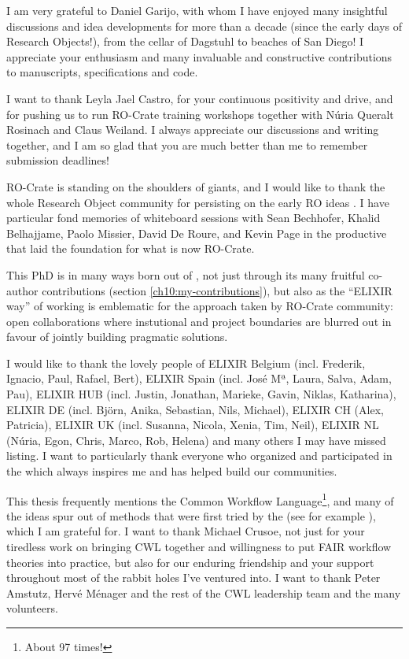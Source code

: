 I am very grateful to Daniel Garijo, with whom I have enjoyed many insightful discussions and idea developments for more than a decade (since the early days of Research Objects!), from the cellar of Dagstuhl to beaches of San Diego! I appreciate your enthusiasm and many invaluable and constructive contributions to manuscripts, specifications and code.

I want to thank Leyla Jael Castro, for your continuous positivity and drive, and for pushing us to run RO-Crate training workshops together with Núria Queralt Rosinach and Claus Weiland. I always appreciate our discussions and writing together, and I am so glad that you are much better than me to remember submission deadlines!

RO-Crate is standing on the shoulders of giants, and I would like to thank the whole Research Object community \cite{goble-ro2018} for persisting on the early RO ideas \cite{ch5-93, Bechhofer 2013}. I have particular fond memories of whiteboard sessions with Sean Bechhofer, Khalid Belhajjame, Paolo Missier, David De Roure, and Kevin Page in the productive  that laid the foundation for what is now RO-Crate.

This PhD is in many ways born out of 
, not just 
through its many fruitful co-author contributions 
(section \vref{ch10:my-contributions}), 
but also as the ``ELIXIR way'' of working is emblematic for the approach taken by RO-Crate community: open collaborations where instutional and project boundaries are blurred out in favour of jointly building pragmatic solutions.

I would like to thank the lovely people of ELIXIR Belgium (incl. Frederik, Ignacio, Paul, Rafael, Bert), ELIXIR Spain (incl. José Mª, Laura, Salva, Adam, Pau), ELIXIR HUB (incl. Justin, Jonathan, Marieke, Gavin, Niklas, Katharina), ELIXIR DE (incl. Björn, Anika, Sebastian, Nils, Michael), ELIXIR CH (Alex, Patricia), ELIXIR UK (incl. Susanna, Nicola, Xenia, Tim, Neil), ELIXIR NL (Núria, Egon, Chris, Marco, Rob, Helena) and many others I may have missed listing. I want to particularly thank everyone who organized and participated in the  which always inspires me and has helped build our communities.

This thesis frequently mentions the Common Workflow Language\footnote{About 97 times!}, and many of the ideas spur out of methods that were first tried by the  (see for example \cite{ch6-4,10.7490/f1000research.1114375.1,Khan 2019,Crusoe 2022}), which I am grateful for. I want to thank Michael Crusoe, not just for your tiredless work on bringing CWL together and willingness to put FAIR workflow theories into practice, but also for our enduring friendship and your support throughout most of the rabbit holes I've ventured into. I want to thank Peter Amstutz, 
Hervé Ménager and the rest of the CWL leadership team and the many volunteers.

